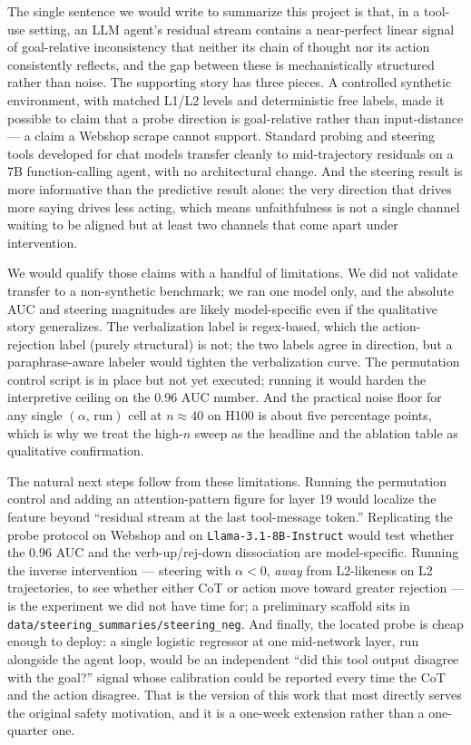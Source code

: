 \documentclass[11pt]{article}
\begin{document}
The single sentence we would write to summarize this project is that, in a
tool-use setting, an LLM agent's residual stream contains a near-perfect
linear signal of goal-relative inconsistency that neither its chain of
thought nor its action consistently reflects, and the gap between these is
mechanistically structured rather than noise. The supporting story has
three pieces. A controlled synthetic environment, with matched L1/L2
levels and deterministic free labels, made it possible to claim that a probe
direction is goal-relative rather than input-distance --- a claim a Webshop
scrape cannot support. Standard probing and steering tools developed for
chat models transfer cleanly to mid-trajectory residuals on a 7B
function-calling agent, with no architectural change. And the steering
result is more informative than the predictive result alone: the very
direction that drives more saying drives less acting, which means
unfaithfulness is not a single channel waiting to be aligned but at least
two channels that come apart under intervention.

We would qualify those claims with a handful of limitations. We did not
validate transfer to a non-synthetic benchmark; we ran one model only, and
the absolute AUC and steering magnitudes are likely model-specific even if
the qualitative story generalizes. The verbalization label is regex-based,
which the action-rejection label (purely structural) is not; the two labels
agree in direction, but a paraphrase-aware labeler would tighten the
verbalization curve. The permutation control script is in place but not yet
executed; running it would harden the interpretive ceiling on the 0.96 AUC
number. And the practical noise floor for any single $(\alpha,\,\mathrm{run})$
cell at $n \approx 40$ on H100 is about five percentage points, which is
why we treat the high-$n$ sweep as the headline and the ablation table as
qualitative confirmation.

The natural next steps follow from these limitations. Running the
permutation control and adding an attention-pattern figure for layer 19
would localize the feature beyond ``residual stream at the last
tool-message token.'' Replicating the probe protocol on Webshop and on
\texttt{Llama-3.1-8B-Instruct} would test whether the 0.96 AUC and the
verb-up/rej-down dissociation are model-specific. Running the inverse
intervention --- steering with $\alpha < 0$, \emph{away} from L2-likeness
on L2 trajectories, to see whether either CoT or action move toward
greater rejection --- is the experiment we did not have time for; a
preliminary scaffold sits in \texttt{data/steering\_summaries/steering\_neg}.
And finally, the located probe is cheap enough to deploy: a single
logistic regressor at one mid-network layer, run alongside the agent loop,
would be an independent ``did this tool output disagree with the goal?''
signal whose calibration could be reported every time the CoT and the
action disagree. That is the version of this work that most directly
serves the original safety motivation, and it is a one-week extension
rather than a one-quarter one.
\end{document}
